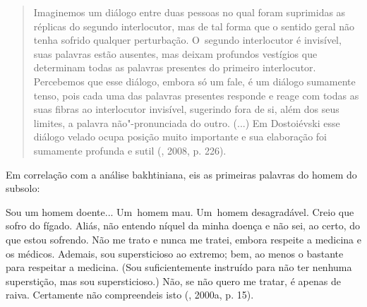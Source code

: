 {\begin{quote}
Imaginemos um diálogo entre duas pessoas no qual foram suprimidas as
réplicas do segundo interlocutor, mas de tal forma que o sentido geral
não tenha sofrido qualquer perturbação. O~segundo interlocutor é
invisível, suas palavras estão ausentes, mas deixam profundos vestígios
que determinam todas as palavras presentes do primeiro interlocutor.
Percebemos que esse diálogo, embora só um fale, é um diálogo sumamente
tenso, pois cada uma das palavras presentes responde e reage com todas
as suas fibras ao interlocutor invisível, sugerindo fora de si, além dos
seus limites, a palavra não"-pronunciada do outro. (...) Em Dostoiévski
esse diálogo velado ocupa posição muito importante e sua elaboração foi
sumamente profunda e sutil (, 2008, p. 226).
\end{quote}

Em correlação com a análise bakhtiniana, eis as primeiras palavras do
homem do subsolo:

Sou um homem doente... Um~homem mau. Um~homem desagradável. Creio que
sofro do fígado. Aliás, não entendo níquel da minha doença e não sei, ao
certo, do que estou sofrendo. Não me trato e nunca me tratei, embora
respeite a medicina e os médicos. Ademais, sou supersticioso ao extremo;
bem, ao menos o bastante para respeitar a medicina. (Sou suficientemente
instruído para não ter nenhuma superstição, mas sou supersticioso.) Não,
se não quero me tratar, é apenas de raiva. Certamente não compreendeis
isto (, 2000a, p. 15).

}
